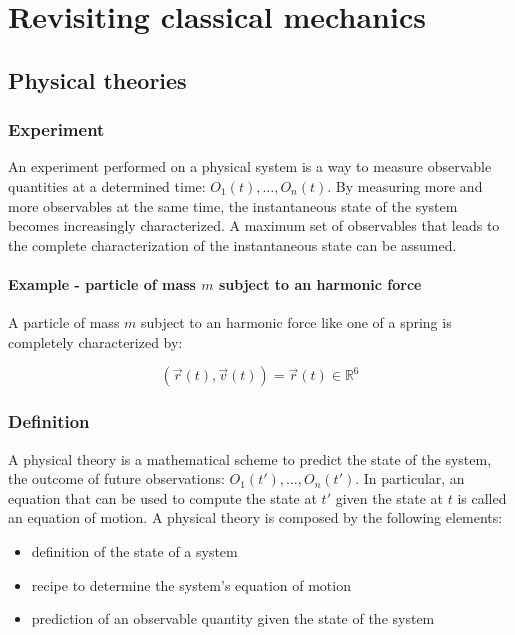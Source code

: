 \chapter{Revisiting classical mechanics}

\section{Physical theories}

  \subsection{Experiment}
  An experiment performed on a physical system is a way to measure observable quantities at a determined time: $O_1(t), \dots, O_n(t)$.
  By measuring more and more observables at the same time, the instantaneous state of the system becomes increasingly characterized.
  A maximum set of observables that leads to the complete characterization of the instantaneous state can be assumed.

    \subsubsection{Example - particle of mass $m$ subject to an harmonic force}
    A particle of mass $m$ subject to an harmonic force like one of a spring is completely characterized by:

    $$(\vec{r}(t),\vec{v}(t))=\vec{r}(t)\in \mathbb{R}^6$$

  \subsection{Definition}
  A physical theory is a mathematical scheme to predict the state of the system, the outcome of future observations: $O_1(t'), \dots, O_n(t')$.
  In particular, an equation that can be used to compute the state at $t'$ given the state at $t$ is called an equation of motion.
  A physical theory is composed by the following elements:

  \begin{multicols}{2}
  \begin{itemize}
      \item definition of the state of a system
      \item recipe to determine the system's equation of motion
      \item prediction of an observable quantity given the state of the system
    \end{itemize}
  \end{multicols}


